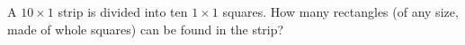 A $10\times1$ strip is divided into ten $1\times1$ squares. How many rectangles (of any size, made of whole squares) can be found in the strip?
